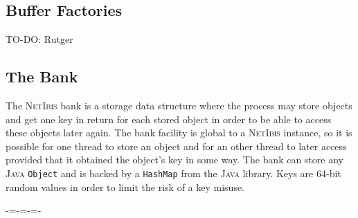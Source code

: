\documentclass[11pt]{book}
\newcommand{\newdoublepage}{\newpage\cleardoublepage}
\def\NetIbis{\textsc{NetIbis}\xspace}
\begin{document}
\subsection{Buffer Factories}
\label{sec:buffer-factories}
TO-DO: Rutger

\subsection{The Bank}
\label{sec:bank}

The \NetIbis bank is a storage data structure where the process may
store objects and get one key in return for each stored object in
order to be able to access these objects later again. The bank
facility is global to a \NetIbis instance, so it is possible for one
thread to store an object and for an other thread to later access
provided that it obtained the object's key in some way. The bank can
store any \textsc{Java} \texttt{Object} and is backed by a
\texttt{HashMap} from the \textsc{Java} library. Keys are 64-bit
random values in order to limit the risk of a key misuse.



\newdoublepage
\backmatter
\pagestyle{empty}
\vspace{3cm}
\begin{center}
-=-=-=-
\end{center}
\newdoublepage
\end{document}
